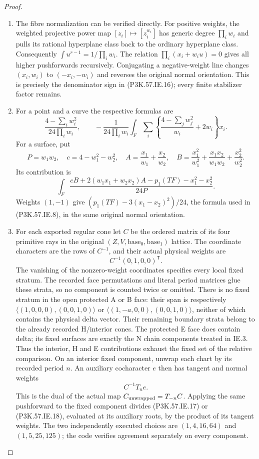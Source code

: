 \begin{proof}
\begin{enumerate}[label=\arabic*.]
\item The fibre normalization can be verified directly. For
positive weights, the weighted projective power map
\([z_i]\mapsto[z_i^{w_i}]\) has generic degree
\(\prod_iw_i\) and pulls its rational hyperplane class
back to the ordinary hyperplane class. Consequently
\(\int u^{r-1}=1/\prod_iw_i\). The relation
\(\prod_i(x_i+w_i u)=0\) gives all higher pushforwards
recursively. Conjugating a negative-weight line changes
\((x_i,w_i)\) to \((-x_i,-w_i)\) and reverses the
original normal orientation. This is precisely the
denominator sign in (P3K.57.IE.16); every finite stabilizer
factor remains.

\item For a point and a curve the respective formulas are
\[
 \frac{4-\sum_iw_i^2}{24\prod_iw_i},\qquad
 -\frac1{24\prod_iw_i}\int_F\sum_i
 \left\{\frac{4-\sum_jw_j^2}{w_i}+2w_i\right\}x_i.
                                                               \tag{P3K.57.IE.17}
\]
For a surface, put
\[
 P=w_1w_2,\quad c=4-w_1^2-w_2^2,\quad
 A=\frac{x_1}{w_1}+\frac{x_2}{w_2},\quad
 B=\frac{x_1^2}{w_1^2}+\frac{x_1x_2}{w_1w_2}
                         +\frac{x_2^2}{w_2^2}.
\]
Its contribution is
\[
 \int_F\frac{cB+2(w_1x_1+w_2x_2)A
                 -p_1(TF)-x_1^2-x_2^2}{24P}.             \tag{P3K.57.IE.18}
\]
Weights \((1,-1)\) give
\((p_1(TF)-3(x_1-x_2)^2)/24\), the formula used
in (P3K.57.IE.8), in the same original normal orientation.

\item For each exported regular cone let \(C\) be the
ordered matrix of its four primitive rays in the
original \((Z,V,\text{base}_0,\text{base}_1)\)
lattice. The coordinate characters are the rows of
\(C^{-1}\), and their actual physical weights are
\[
                    C^{-1}(0,1,0,0)^{\mathsf T}.        \tag{P3K.57.IE.19}
\]
The vanishing of the nonzero-weight coordinates
specifies every local fixed stratum. The recorded
face permutations and literal period matrices glue
these strata, so no component is counted twice or
omitted. There is no fixed stratum in the open
protected A or B face: their span is respectively
\(\langle(1,0,0,0),(0,0,1,0)\rangle\) or
\(\langle(1,-a,0,0),(0,0,1,0)\rangle\), neither
of which contains the physical delta vector.
Their remaining boundary strata belong to the
already recorded H/interior cones. The protected
E face does contain delta; its fixed surfaces are
exactly the N chain components treated in IE.3.
Thus the interior, H and E contributions exhaust
the fixed set of the relative comparison.
On an interior fixed component, unwrap
each chart by its recorded period \(n\). An
auxiliary cocharacter \(e\) then has tangent and
normal weights
\[
                            C^{-1}T_n e.                 \tag{P3K.57.IE.20}
\]
This is the dual of the actual map
\(C_{\rm unwrapped}=T_{-n}C\). Applying the same
pushforward to the fixed component divides (P3K.57.IE.17)
or (P3K.57.IE.18), evaluated at its auxiliary roots, by
the product of its tangent weights. The two
independently executed choices are
\((1,4,16,64)\) and \((1,5,25,125)\); the code
verifies agreement separately on every component.


\end{enumerate}
\end{proof}
